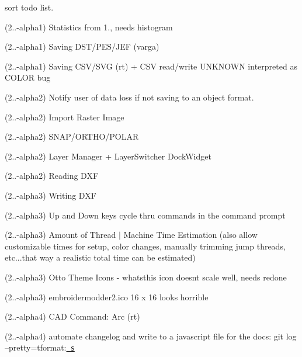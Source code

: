 \begin{DoxyRefList}
\label{todo__todo000238}%
%
sort todo list.

\label{todo__todo000239}%
%
(2..-\/alpha1) Statistics from 1., needs histogram

\label{todo__todo000240}%
%
(2..-\/alpha1) Saving DST/\+PES/\+JEF (varga)

\label{todo__todo000241}%
%
(2..-\/alpha1) Saving CSV/\+SVG (rt) + CSV read/write UNKNOWN interpreted as COLOR bug

\label{todo__todo000242}%
%
(2..-\/alpha2) Notify user of data loss if not saving to an object format.

\label{todo__todo000243}%
%
(2..-\/alpha2) Import Raster Image

\label{todo__todo000244}%
%
(2..-\/alpha2) SNAP/\+ORTHO/\+POLAR

\label{todo__todo000245}%
%
(2..-\/alpha2) Layer Manager + Layer\+Switcher Dock\+Widget

\label{todo__todo000246}%
%
(2..-\/alpha2) Reading DXF

\label{todo__todo000247}%
%
(2..-\/alpha3) Writing DXF

\label{todo__todo000248}%
%
(2..-\/alpha3) Up and Down keys cycle thru commands in the command prompt

\label{todo__todo000249}%
%
(2..-\/alpha3) Amount of Thread $|$ Machine Time Estimation (also allow customizable times for setup, color changes, manually trimming jump threads, etc...that way a realistic total time can be estimated)

\label{todo__todo000250}%
%
(2..-\/alpha3) Otto Theme Icons -\/ whatsthis icon doesn\textquotesingle{}t scale well, needs redone

\label{todo__todo000251}%
%
(2..-\/alpha3) embroidermodder2.\+ico 16 x 16 looks horrible

\label{todo__todo000252}%
%
(2..-\/alpha4) CAD Command\+: Arc (rt)

\label{todo__todo000253}%
%
(2..-\/alpha4) automate changelog and write to a javascript file for the docs\+: git log --pretty=tformat\+:\textquotesingle{}\href{\\url{https://github.com/Embroidermodder/Embroidermodder/commit/\%H}}{\texttt{ s}}\textquotesingle{}


\end{DoxyRefList}

